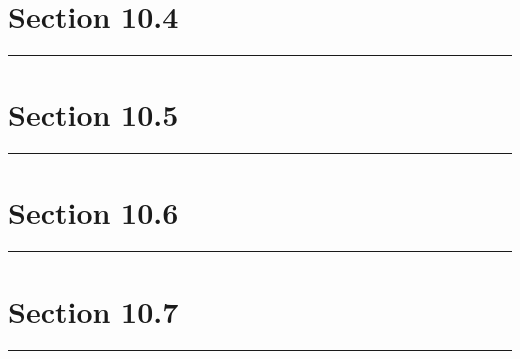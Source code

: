 \documentclass[12pt]{article}
\begin{document}
    \section*{Section 10.4}
    \noindent\rule{\textwidth}{0.4pt}
    

    \section*{Section 10.5}
    \noindent\rule{\textwidth}{0.4pt}


    \section*{Section 10.6}
    \noindent\rule{\textwidth}{0.4pt}


    \section*{Section 10.7}
    \noindent\rule{\textwidth}{0.4pt}
\end{document}
